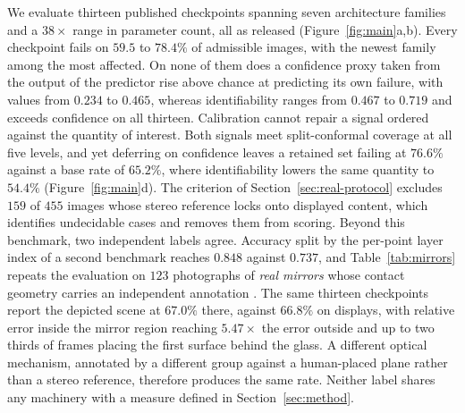 \documentclass{article} %
\theoremstyle{defstyle}
\theoremstyle{plain}
\begin{document}
We evaluate thirteen published checkpoints spanning seven architecture families and a
$38\times$ range in parameter count, all as released
\citep{depthanything2024,da3_2025,depthpro2025,moge2025,moge3_2026,metric3d2023,unidepth2024,unidepthv2_2025}
(Figure~\ref{fig:main}a,b). Every checkpoint fails on $59.5$ to $78.4\%$ of admissible
images, with the newest family among the most affected. On none of them does a confidence
proxy taken from the output of the predictor rise above chance at predicting its own
failure, with values from $0.234$ to $0.465$, whereas identifiability ranges from $0.467$
to $0.719$ and exceeds confidence on all thirteen. Calibration cannot repair a signal
ordered against the quantity of interest. Both signals meet split-conformal coverage at all
five levels, and yet deferring on confidence leaves a retained set failing at $76.6\%$
against a base rate of $65.2\%$, where identifiability lowers the same quantity to $54.4\%$
(Figure~\ref{fig:main}d). The criterion of Section~\ref{sec:real-protocol} excludes $159$ of
$455$ images whose stereo reference locks onto displayed content, which identifies
undecidable cases and removes them from scoring. Beyond this benchmark, two independent labels
agree. Accuracy split by the per-point layer index of a second benchmark reaches $0.848$
against $0.737$, and Table~\ref{tab:mirrors} repeats the evaluation on $123$ photographs of
\emph{real mirrors} whose contact geometry carries an independent annotation
\citep{mirror3d2021}. The same thirteen checkpoints report the depicted scene at $67.0\%$
there, against $66.8\%$ on displays, with relative error inside the mirror region reaching
$5.47\times$ the error outside and up to two thirds of frames placing the first surface
behind the glass. A different optical mechanism, annotated by a different group against a
human-placed plane rather than a stereo reference, therefore produces the same rate. Neither
label shares any machinery with a measure defined in Section~\ref{sec:method}.
\end{document}
